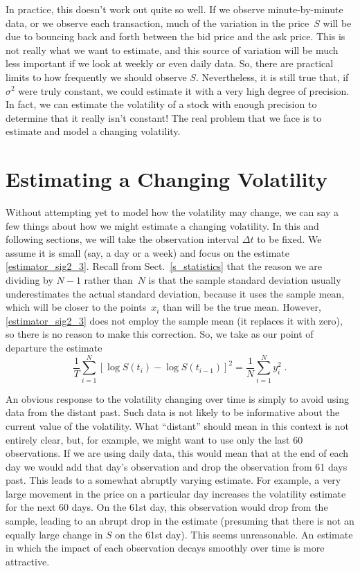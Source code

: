 In practice, this doesn't work out quite so well.  If we observe minute-by-minute data, or we observe each transaction, much of the variation in the price~$S$ will be due to bouncing back and forth between the bid price and the ask price.  This is not really what we want to estimate, and this source of variation will be much less important if we look at weekly or even daily data.  So, there are practical limits to how frequently we should observe $S$.  Nevertheless, it is still true that, if $\sigma^2$ were truly constant, we could estimate it with a very high degree of precision.
In fact, we can estimate the volatility of a stock with enough precision to determine that it really isn't constant!  The real problem that we face is to estimate and model a changing volatility.  

\section{Estimating a Changing Volatility}
Without attempting yet to model how the volatility may change, we can say a few things about how we might estimate a changing volatility.  In this and following sections, we will take the observation interval $\varDelta t$ to be fixed.  We assume it is small (say, a day or a week) and focus on the estimate \eqref{estimator_sig2_3}.  Recall from Sect.~\ref{s_statistics} that the reason we are dividing by $N-1$ rather than~$N$ is that the sample standard deviation usually underestimates the actual standard deviation, because it uses the sample mean, which will be closer to the points~$x_i$ than will be the true mean.  However, \eqref{estimator_sig2_3} does not employ the sample mean (it replaces it with zero), so there is no reason to make this correction.  So, we take as our point of departure the estimate
$$\frac{1}{T} \sum_{i=1}^N [\log S(t_i)-\log S(t_{i-1})]^2 = \frac{1}{N}\sum_{i=1}^N y_i^2 \; .$$

An obvious response to the volatility changing over time is simply to avoid using data from the distant past.  Such data is not likely to be informative about the current value of the volatility.  What ``distant'' should mean in this context is not entirely clear, but, for example, we might want to use only the last 60 observations.  If we are using daily data, this would mean that at the end of each day we would add that day's observation and drop the observation from 61 days past.  This leads to a somewhat abruptly varying estimate.  For example, a very large movement in the price on a particular day increases the volatility estimate for the next 60 days.  On the 61st day, this observation would drop from the sample, leading to an abrupt drop in the estimate (presuming that there is not an equally large change in $S$ on the 61st day).  This seems unreasonable.  An estimate in which the impact of each observation decays smoothly over time is more attractive.  

